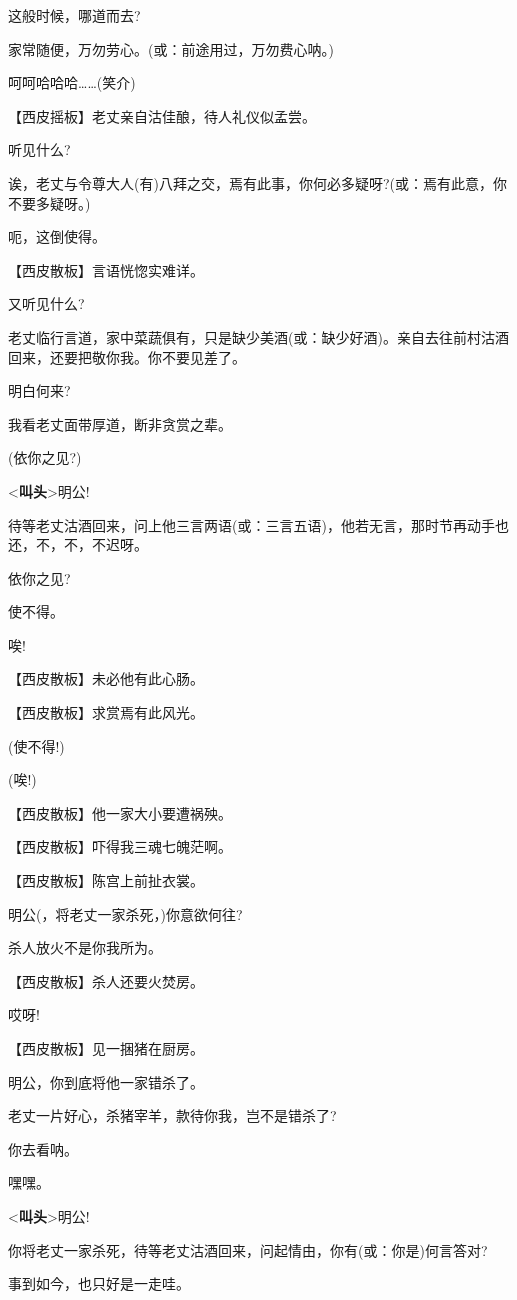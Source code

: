 这般时候，哪道而去?

家常随便，万勿劳心。(或：前途用过，万勿费心呐。)

呵呵哈哈哈\ldots{}\ldots{}(笑介)

【西皮摇板】老丈亲自沽佳酿，待人礼仪似孟尝。

听见什么?

诶，老丈与令尊大人(有)八拜之交，焉有此事，你何必多疑呀?(或：焉有此意，你不要多疑呀。)

呃，这倒使得。

【西皮散板】言语恍惚实难详。

又听见什么?

老丈临行言道，家中菜蔬俱有，只是缺少美酒(或：缺少好酒)。亲自去往前村沽酒回来，还要把敬你我。你不要见差了。

明白何来?

我看老丈面带厚道，断非贪赏之辈。

(依你之见?)

\textless{}\textbf{叫头}\textgreater{}明公!

待等老丈沽酒回来，问上他三言两语(或：三言五语)，他若无言，那时节再动手也还，不，不，不迟呀。

依你之见?

使不得。

唉!

【西皮散板】未必他有此心肠。

【西皮散板】求赏焉有此风光。

(使不得!)

(唉!)

【西皮散板】他一家大小要遭祸殃。

【西皮散板】吓得我三魂七魄茫啊。

【西皮散板】陈宫上前扯衣裳。

明公(，将老丈一家杀死，)你意欲何往?

杀人放火不是你我所为。

【西皮散板】杀人还要火焚房。

哎呀!

【西皮散板】见一捆猪在厨房。

明公，你到底将他一家错杀了。

老丈一片好心，杀猪宰羊，款待你我，岂不是错杀了?

你去看呐。

嘿嘿。

\textless{}\textbf{叫头}\textgreater{}明公!

你将老丈一家杀死，待等老丈沽酒回来，问起情由，你有(或：你是)何言答对?

事到如今，也只好是一走哇。

